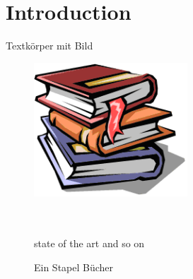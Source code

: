 %
%
% 
% 
% 


\chapter{Introduction}
\label{chap:intro}

Textkörper mit Bild

\begin{figure}[htbp]
	\centering
		\includegraphics[height=5cm]{images/buecher}
	\caption{Ein Stapel Bücher}
	\label{fig:buecher}\\\\
	state of the art and so on
\end{figure}



